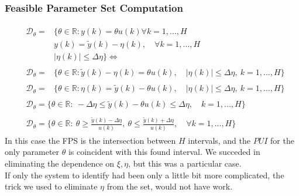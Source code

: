 \subsubsection{Feasible Parameter Set Computation}
{\large{
    \begin{align*}
        &\begin{aligned}
            \mathcal{D}_\theta = &\{
                \theta \in \mathbb{R}: y(k)=\theta u(k) \forall k=1,..., H \\
                &y(k)=\tilde{y}(k)-\eta(k), \quad \forall k=1,...,H\\
                &\vert \eta(k) \vert \le \Delta\eta
            \}\Longleftrightarrow
        \end{aligned}\\ 
        &\begin{aligned}
            \mathcal{D}_\theta = &\{
                \theta \in \mathbb{R}: \tilde{y}(k)-\eta(k)=\theta u(k), \quad
                \vert \eta(k) \vert \le \Delta\eta, \ 
                k=1,...,H 
            \}
        \end{aligned}\\
        &\begin{aligned}
            \mathcal{D}_\theta = &\{
                \theta \in \mathbb{R}: \eta(k)=\tilde{y}(k)-\theta u(k), \quad
                \vert \eta(k) \vert \le \Delta\eta, \ 
                k=1,...,H 
            \}
        \end{aligned}\\
        &\begin{aligned}
            \mathcal{D}_\theta = \{
                \theta \in \mathbb{R}: \
                -\Delta\eta \le \tilde{y}(k)-\theta u(k) \le \Delta\eta, \quad
                k=1,...,H
            \}
        \end{aligned}\\
        &\begin{aligned}
            \mathcal{D}_\theta = \bigg\{
                \theta \in \mathbb{R}: \ 
                \theta \ge \frac{\tilde{y}(k)-\Delta\eta}{u(k)}, \ \theta \le \frac{\tilde{y}(k)+\Delta\eta}{u(k)}, \quad \forall k=1,...,H
            \bigg\}
        \end{aligned}
    \end{align*}
}}
In this case the FPS is the intersection between $H$ intervals, and the $PUI$ for the only parameter $\theta$ is coincident with this found interval.
We succeded in eliminating the dependence on $\xi,\eta$, but this was a particular case.\\
If only the system to identify had been only a little bit more complicated, the trick we used to eliminate $\eta$ from the set, would not have work. 

